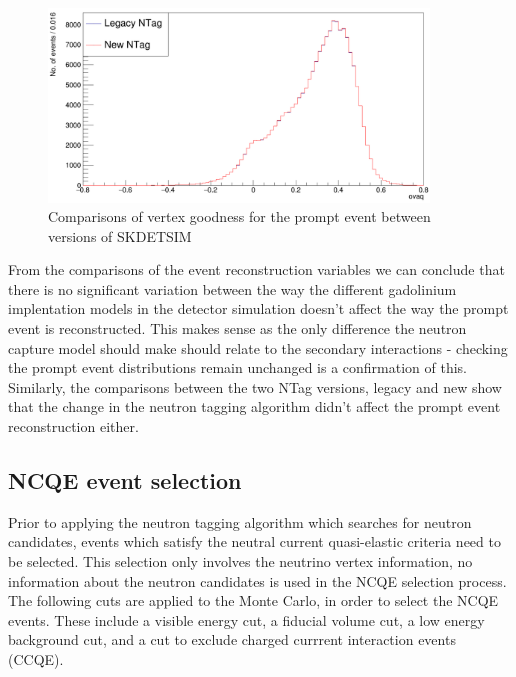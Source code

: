 \begin{figure}
    \centering
    \includegraphics[width=0.9\textwidth]{Figures/ovaq_recon_compare.PNG}
    \caption{Comparisons of vertex goodness for the prompt event between versions of SKDETSIM}
    \label{fig:ovaq_recon_compare}

\end{figure}

From the comparisons of the event reconstruction variables we can conclude that there is no significant variation between the way the different gadolinium implentation models in the detector simulation doesn't affect the way the prompt event is reconstructed. This makes sense as the only difference the neutron capture model should make should relate to the secondary interactions - checking the prompt event distributions remain unchanged is a confirmation of this. Similarly, the comparisons between the two NTag versions, legacy and new show that the change in the neutron tagging algorithm didn't affect the prompt event reconstruction either. 


\subsection{NCQE event selection}

Prior to applying the neutron tagging algorithm which searches for neutron candidates, events which satisfy the neutral current quasi-elastic criteria need to be selected. This selection only involves the neutrino vertex information, no information about the neutron candidates is used in the NCQE selection process. 
\newline
The following cuts are applied to the Monte Carlo, in order to select the NCQE events. These include a visible energy cut, a fiducial volume cut, a low energy background cut, and a cut to exclude charged currrent interaction events (CCQE). 

